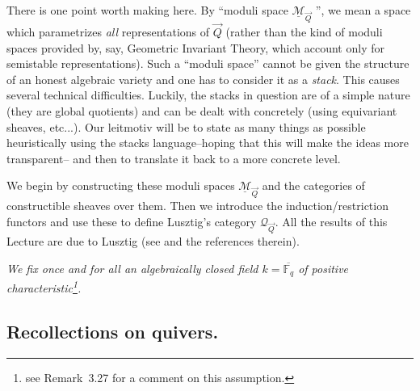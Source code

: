 \documentclass[a4paper,10pt]{amsart}
\numberwithin{equation}{section}
\begin{document}
There is one point worth making here. By ``moduli space $\underline{\mathcal{M}}_{\vec{Q}}$ '', we mean a space which parametrizes \textit{all} representations of $\vec{Q}$ (rather than the kind of moduli spaces provided by, say, Geometric Invariant Theory, which account only for semistable representations). Such a ``moduli space'' cannot be given the structure of an honest algebraic variety and one has to consider it as a \textit{stack}. This causes several technical difficulties. Luckily, the stacks in question are of a simple nature (they are global quotients) and can be dealt with concretely (using equivariant sheaves, etc...). Our leitmotiv will be to state as many things as possible heuristically using the stacks language--hoping that this will make the ideas more transparent-- and then to translate it back to a more concrete level.

We begin by constructing these moduli spaces $\underline{\mathcal{M}}_{\vec{Q}}$ and the categories of constructible sheaves over them. Then we introduce the induction/restriction functors and use these to define Lusztig's category $\mathcal{Q}_{\vec{Q}}$. All the results of this Lecture are due to Lusztig (see \cite{Lusbook} and the references therein).

\vspace{.1in}

\textit{We fix once and for all an algebraically closed field $k=\overline{\mathbb{F}_q}$ of positive characteristic\footnote{see Remark~3.27 for a comment on this assumption.}.}

\vspace{.3in}

\subsection{Recollections on quivers.}

\vspace{.15in}
\end{document}
